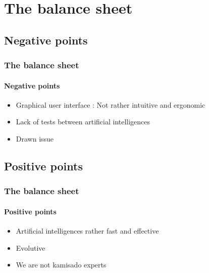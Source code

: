 \documentclass[a4paper, 11pt]{beamer}
\begin{document}
\section{The balance sheet}
\subsection{Negative points}
\begin{frame}
 \frametitle{The balance sheet}
 \framesubtitle{Negative points}
 \begin{itemize}
  \item Graphical user interface : Not rather intuitive and ergonomic
  \item Lack of tests between artificial intelligences
  \item Drawn issue
 \end{itemize}
\end{frame}

\subsection{Positive points}
\begin{frame}
 \frametitle{The balance sheet}
 \framesubtitle{Positive points}
 \begin{itemize}
  \item Artificial intelligences rather fast and effective
  \item Evolutive
  \item We are not kamisado experts
 \end{itemize}
\end{frame}
\end{document}
